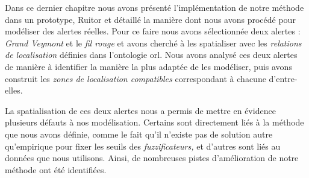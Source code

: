 Dans ce dernier chapitre nous avons présenté l'implémentation de notre
méthode dans un prototype, Ruitor et détaillé la manière dont nous
avons procédé pour modéliser des alertes réelles. Pour ce faire nous
avons sélectionnée deux alertes : \emph{Grand Veymont} et le \emph{fil
  rouge} et avons cherché à les spatialiser avec les \emph{relations
  de localisation} définies dans l'ontologie \ac{orl}. Nous avons
analysé ces deux alertes de manière à identifier la manière la plus
adaptée de les modéliser, puis avons construit les \emph{zones de
  localisation compatibles} correspondant à chacune d'entre-elles.

La spatialisation de ces deux alertes nous a permis de mettre en
évidence plusieurs défauts à nos modélisation. Certains sont
directement liés à la méthode que nous avons définie, comme le fait
qu'il n'existe pas de solution autre qu'empirique pour fixer les
seuils des \emph{fuzzificateurs,} et d'autres sont liés au données que
nous utilisons. Ainsi, de nombreuses pistes d'amélioration de notre
méthode ont été identifiées.

